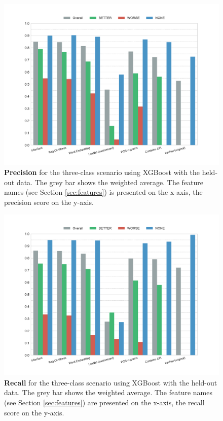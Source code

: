\begin{figure}[htbp]
         \caption{\textbf{Precision} for the three-class scenario using XGBoost with the held-out data. The grey bar shows the weighted average. The feature names (see Section \ref{sec:features}) is presented on the x-axis, the precision score on the y-axis.} 
    \label{fig:h_3_prec}
    \centering
	\includegraphics[width=0.9\linewidth]{images/heldout/h-precision-False}
    \end{figure}
    
    \begin{figure}[htbp]
              \caption{\textbf{Recall} for the three-class scenario using XGBoost with the held-out data. The grey bar shows the weighted average. The feature names (see Section \ref{sec:features}) are presented on the x-axis, the recall score on the y-axis.} 
       \label{fig:h_3_rec}
 \centering
	\includegraphics[width=0.9\linewidth]{images/heldout/h-recall-False}

\end{figure}



